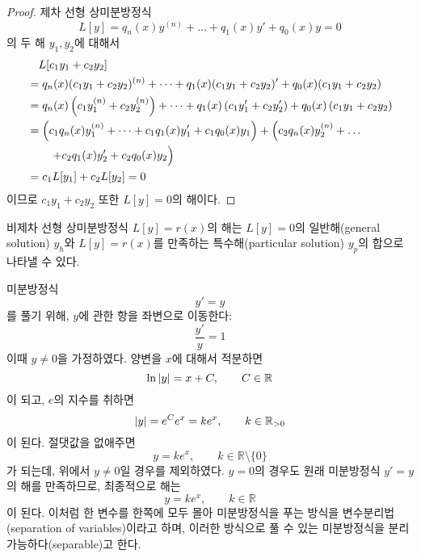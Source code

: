 \documentclass[../engineering_mathematics_lecture_note.tex]{subfiles}
\begin{document}
\begin{proof}
    제차 선형 상미분방정식
    \begin{equation*}
        L[y] = q_n(x) y^{(n)} + \dots + q_1(x) y' + q_0(x) y = 0
    \end{equation*}
    의 두 해 $y_1, y_2$에 대해서
    \begin{align*}
        &\quad L[c_1 y_1 + c_2 y_2]\\
        &= q_n(x) (c_1 y_1 + c_2 y_2)^{(n)} + \dots + q_1(x) (c_1 y_1 + c_2 y_2)' + q_0(x) (c_1 y_1 + c_2 y_2)\\
        &= q_n(x) \left(c_1 y_1^{(n)} + c_2 y_2^{(n)}\right) + \dots + q_1(x) \left(c_1 y_1' + c_2 y_2'\right) + q_0(x) \left(c_1 y_1 + c_2 y_2\right)\\
        &= \left(c_1 q_n(x) y_1^{(n)} + \dots + c_1 q_1(x) y_1' + c_1 q_0(x) y_1\right) + \left(c_2 q_n(x) y_2^{(n)} + \dots\right.\\
        &\qquad\left.+ c_2 q_1(x) y_2' + c_2 q_0(x) y_2\vphantom{y^{(n)}}\right)\\
                             &= c_1 L[y_1] + c_2 L[y_2] = 0
    \end{align*}
    이므로 $c_1 y_1 + c_2 y_2$ 또한 $L[y] = 0$의 해이다.
\end{proof}

\begin{theorem} \label{thm:general_particular}
    비제차 선형 상미분방정식 $L[y] = r(x)$의 해는 $L[y] = 0$의 일반해(general solution) $y_h$와 $L[y] = r(x)$를 만족하는 특수해(particular solution) $y_p$의 합으로 나타낼 수 있다.
\end{theorem}

\begin{example}
    미분방정식
    \begin{equation*}
        y' = y
    \end{equation*}
    를 풀기 위해, $y$에 관한 항을 좌변으로 이동한다:
    \begin{equation*}
        \frac{y'}{y} = 1
    \end{equation*}
    이때 $y \neq 0$을 가정하였다.
    양변을 $x$에 대해서 적분하면
    \begin{equation*}
        \ln \abs{y} = x + C, \qquad C \in \mathbb R
    \end{equation*}
    이 되고, $e$의 지수를 취하면
    \begin{equation*}
        \abs{y} = e^C e^x = k e^x, \qquad k \in \mathbb R_{> 0}
    \end{equation*}
    이 된다.
    절댓값을 없애주면
    \begin{equation*}
        y = k e^x, \qquad k \in \mathbb R \setminus \{0\}
    \end{equation*}
    가 되는데, 위에서 $y \neq 0$일 경우를 제외하였다.
    $y = 0$의 경우도 원래 미분방정식 $y' = y$의 해를 만족하므로, 최종적으로 해는
    \begin{equation*}
        y = k e^x, \qquad k \in \mathbb R
    \end{equation*}
    이 된다.
    이처럼 한 변수를 한쪽에 모두 몰아 미분방정식을 푸는 방식을 변수분리법(separation of variables)이라고 하며, 이러한 방식으로 풀 수 있는 미분방정식을 분리 가능하다(separable)고 한다.
\end{example}
\end{document}
